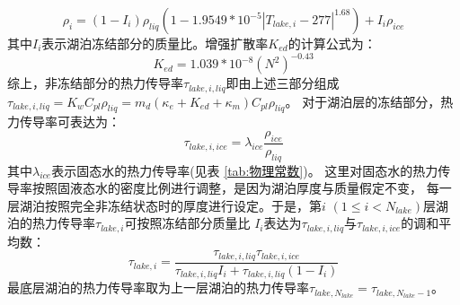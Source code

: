 \begin{equation}\label{rho_i}
\rho_{i}=\left(1-I_{i}\right) \rho_{liq}\left(1-1.9549 * 10^{-5}\left|T_{lake, i}-277\right|^{1.68}\right)+I_{i} \rho_{ice}
\end{equation}
其中$I_i$表示湖泊冻结部分的质量比。增强扩散率$K_{ed}$的计算公式为\citep{fang1996long}：
\begin{equation}
K_{e d}=1.039 * 10^{-8}\left(N^{2}\right)^{-0.43}
\end{equation}
综上，非冻结部分的热力传导率$\tau_{lake,i,liq}$即由上述三部分组成
$\tau_{lake,i,liq}=K_wC_{pl}\rho_{liq}=m_d\left(\kappa_e+K_{ed}+\kappa_m\right)C_{pl}\rho_{liq}$。
对于湖泊层的冻结部分，热力传导率可表达为：
\begin{equation}
\tau_{lake,i,ice}=\lambda_{ice} \frac{\rho_{ice}}{\rho_{liq}}
\end{equation}
其中$\lambda_{ice}$表示固态水的热力传导率(见表 \ref{tab:物理常数})。
这里对固态水的热力传导率按照固液态水的密度比例进行调整，是因为湖泊厚度与质量假定不变，
每一层湖泊按照完全非冻结状态时的厚度进行设定。于是，第$i$ $\left(1\le i<N_{lake}\right)$层湖泊的热力传导率$\tau_{lake,i}$可按照冻结部分质量比
$I_i$表达为$\tau_{lake,i,liq}$与$\tau_{lake,i,ice}$的调和平均数：
\begin{equation}
\tau_{lake, i}=\frac{\tau_{lake, i, liq} \tau_{lake, i, ice}}{\tau_{lake, i, liq} I_{i}+\tau_{lake, i, liq}\left(1-I_{i}\right)}
\end{equation}
最底层湖泊的热力传导率取为上一层湖泊的热力传导率$\tau_{lake,N_{lake}}=\tau_{lake,N_{lake}-1}$。 


